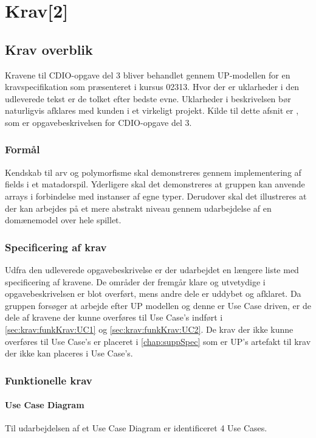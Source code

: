 \chapter{Krav[2]}\label{chap:krav}

\section{Krav overblik}\label{sec:krav:kravOverblik}
Kravene til CDIO-opgave del 3 bliver behandlet gennem UP-modellen for en kravspecifikation som præsenteret i kursus 02313. Hvor der er uklarheder i den udleverede tekst er de tolket efter bedste evne. Uklarheder i beskrivelsen bør naturligvis afklares med kunden i et virkeligt projekt. Kilde til dette afsnit er \cite{CDIOdel3}, som er opgavebeskrivelsen for CDIO-opgave del 3.

\subsection{Formål}\label{sec:krav:formål}
Kendskab til arv og polymorfisme skal demonstreres gennem implementering af fields i et matadorspil. Yderligere skal det demonstreres at gruppen kan anvende arrays i forbindelse med instanser af egne typer. Derudover skal det illustreres at der kan arbejdes på et mere abstrakt niveau gennem udarbejdelse af en domænemodel over hele spillet. 

\subsection{Specificering af krav}\label{sec:krav:kravSpec}
Udfra den udleverede opgavebeskrivelse \cite{CDIOdel3} er der udarbejdet en længere liste med specificering af kravene. De områder der fremgår klare og utvetydige i opgavebeskrivelsen er blot overført, mens andre dele er uddybet og afklaret. Da gruppen forsøger at arbejde efter UP modellen og denne er Use Case driven, er de dele af kravene der kunne overføres til Use Case's indført i \vref{sec:krav:funkKrav:UC1} og \vref{sec:krav:funkKrav:UC2}. De krav der ikke kunne overføres til Use Case's er placeret i \vref{chap:suppSpec} som er UP's artefakt til krav der ikke kan placeres i Use Case's.
 
\subsection{Funktionelle krav}\label{sec:krav:funkKrav}
\subsubsection{Use Case Diagram}\label{sec:krav:funkKrav:useCaseDia}
Til udarbejdelsen af et Use Case Diagram er identificeret 4 Use Cases. 

